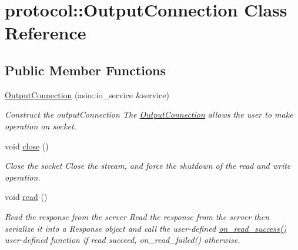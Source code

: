 \hypertarget{classprotocol_1_1_output_connection}{}\section{protocol\+:\+:Output\+Connection Class Reference}
\label{classprotocol_1_1_output_connection}
\subsection*{Public Member Functions}
\begin{DoxyCompactItemize}
\item 
\hyperlink{classprotocol_1_1_output_connection_a61ed3f73d4513e1616753ea59f193e1e}{Output\+Connection} (asio\+::io\+\_\+service \&service)
\begin{DoxyCompactList}\small\item\em Construct the output\+Connection The \hyperlink{classprotocol_1_1_output_connection}{Output\+Connection} allows the user to make operation on socket. \end{DoxyCompactList}\item 
\mbox{\label{classprotocol_1_1_output_connection_afaf4c8e22454b4908143b876e956a475}} 
void \hyperlink{classprotocol_1_1_output_connection_afaf4c8e22454b4908143b876e956a475}{close} ()
\begin{DoxyCompactList}\small\item\em Close the socket Close the stream, and force the shutdown of the read and write operation. \end{DoxyCompactList}\item 
\mbox{\label{classprotocol_1_1_output_connection_a5090474d6d3a8ad0189a1f4ef3fa2e56}} 
void \hyperlink{classprotocol_1_1_output_connection_a5090474d6d3a8ad0189a1f4ef3fa2e56}{read} ()
\begin{DoxyCompactList}\small\item\em Read the response from the server Read the response from the server then serialize it into a Response object and call the user-\/defined \hyperlink{classprotocol_1_1_output_connection_a3592638f2e736b85d0cd094d94bacdcf}{on\+\_\+read\+\_\+success()} user-\/defined function if read succeed, on\+\_\+read\+\_\+failed() otherwise. \end{DoxyCompactList}\item 

\end{DoxyCompactItemize}

